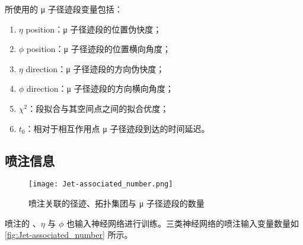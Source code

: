 所使用的 μ 子径迹段变量包括：
\begin{enumerate}
      \item $\eta$ position：μ 子径迹段的位置伪快度；
      \item $\phi$ position：μ 子径迹段的位置横向角度；
      \item $\eta$ direction：μ 子径迹段的方向伪快度；
      \item $\phi$ direction：μ 子径迹段的方向横向角度；
      \item $\chi^2$：段拟合与其空间点之间的拟合优度；
      \item $t_0$：相对于相互作用点 μ 子径迹段到达的时间延迟。
\end{enumerate}

\subsection{喷注信息}
\begin{figure}[ht]
      \centering
      \texttt{[image: Jet-associated\_number.png]}
      \caption{喷注关联的径迹、拓扑集团与 μ 子径迹段的数量}
      \label{fig:Jet-associated_number}
\end{figure}

喷注的 \pt、$\eta$ 与 $\phi$ 也输入神经网络进行训练。三类神经网络的喷注输入变量数量如\autoref{fig:Jet-associated_number} 所示。
